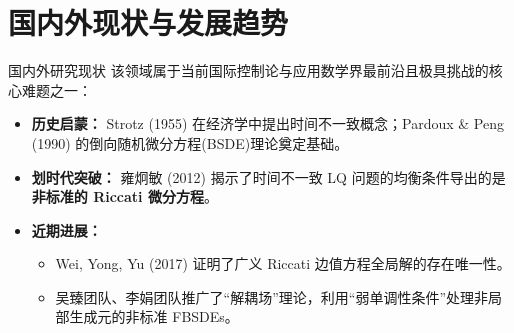 \documentclass[aspectratio=169, 10pt]{ctexbeamer}
\begin{document}
	\section{国内外现状与发展趋势}
	
	\begin{frame}{国内外研究现状}
		该领域属于当前国际控制论与应用数学界最前沿且极具挑战的核心难题之一：
		
		\vspace{0.3cm}
		\begin{itemize}
			\item \textbf{\textcolor{AcademicBlue}{历史启蒙：}} Strotz (1955) 在经济学中提出时间不一致概念；Pardoux \& Peng (1990) 的倒向随机微分方程(BSDE)理论奠定基础。
			\item \textbf{\textcolor{AcademicBlue}{划时代突破：}} 雍炯敏 (2012) 揭示了时间不一致 LQ 问题的均衡条件导出的是\textbf{非标准的 Riccati 微分方程}。
			\item \textbf{\textcolor{AcademicBlue}{近期进展：}} 
			\begin{itemize}
				\item Wei, Yong, Yu (2017) 证明了广义 Riccati 边值方程全局解的存在唯一性。
				\item 吴臻团队、李娟团队推广了“解耦场”理论，利用“弱单调性条件”处理非局部生成元的非标准 FBSDEs。
			\end{itemize}
		\end{itemize}
	\end{frame}
	
	
\end{document}
